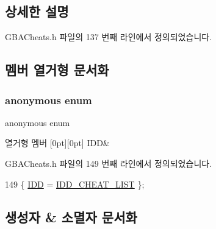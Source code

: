\subsection{상세한 설명}


G\+B\+A\+Cheats.\+h 파일의 137 번째 라인에서 정의되었습니다.



\subsection{멤버 열거형 문서화}
\mbox{\label{class_g_b_a_cheat_list_a5248aad32e8c4e9324c6921e0ff5bf73}} 
\subsubsection{\texorpdfstring{anonymous enum}{anonymous enum}}
{\footnotesize\ttfamily anonymous enum}

\begin{DoxyEnumFields}{열거형 멤버}
[0pt][0pt]{}\mbox{\label{class_g_b_a_cheat_list_a5248aad32e8c4e9324c6921e0ff5bf73adf76e36e331d8dcfe67fbac8593caeed}} 
I\+DD&\\
\hline

\end{DoxyEnumFields}


G\+B\+A\+Cheats.\+h 파일의 149 번째 라인에서 정의되었습니다.


\begin{DoxyCode}
149 \{ \mbox{\hyperlink{class_g_b_a_cheat_list_a5248aad32e8c4e9324c6921e0ff5bf73adf76e36e331d8dcfe67fbac8593caeed}{IDD}} = \mbox{\hyperlink{resource_8h_ad8b8f80b61a3118457747fa537be9bd3}{IDD\_CHEAT\_LIST}} \};
\end{DoxyCode}


\subsection{생성자 \& 소멸자 문서화}
\mbox{\label{class_g_b_a_cheat_list_a0310a79ee81d4d26e02e347e1eacbf95}} 
